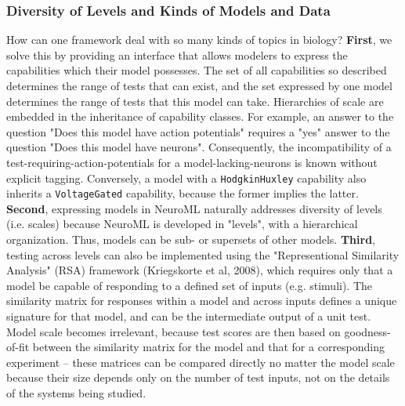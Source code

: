 \documentclass[11pt,letterpaper]{article}
\begin{document}
\subsubsection{Diversity of Levels and Kinds of Models and Data}
How can one framework deal with so many kinds of topics in biology?  \textbf{First}, we solve this by providing an interface that allows modelers to express the capabilities which their model possesses.  The set of all capabilities so described determines the range of tests that can exist, and the set expressed by one model determines the range of tests that this model can take.  Hierarchies of scale are embedded in the inheritance of capability classes.  For example, an answer to the question "Does this model have action potentials" requires a "yes" answer to the question "Does this model have neurons".  Consequently, the incompatibility of a test-requiring-action-potentials for a model-lacking-neurons is known without explicit tagging.  Conversely, a model with a \verb|HodgkinHuxley| capability also inherits a \verb|VoltageGated| capability, because the former implies the latter. \textbf{Second}, expressing models in NeuroML naturally addresses diversity of levels (i.e. scales) because NeuroML is developed in "levels", with a hierarchical organization.  Thus, models can be sub- or supersets of other models.  \textbf{Third}, testing across levels can also be implemented using the "Representional Similarity Analysis" (RSA) framework (Kriegskorte et al, 2008), which requires only that a model be capable of responding to a defined set of inputs (e.g. stimuli).  The similarity matrix for responses within a model and across inputs defines a unique signature for that model, and can be the intermediate output of a unit test.  Model scale becomes irrelevant, because test scores are then based on goodness-of-fit between the similarity matrix for the model and that for a corresponding experiment -- these matrices can be compared directly no matter the model scale because their size depends only on the number of test inputs, not on the details of the systems being studied.  
\end{document}
